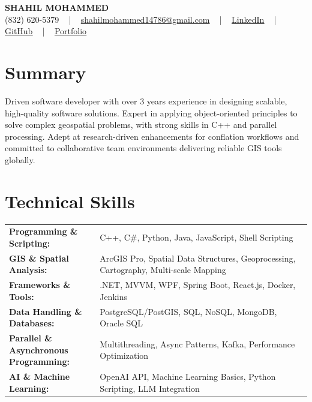 \documentclass[letterpaper,11pt]{article}
\begin{document}
\begin{center}
    {\fontsize{14pt}{12pt}\selectfont \textbf{\MakeUppercase{Shahil Mohammed}}}\\ \vspace{2pt}
    \fontsize{10pt}{12pt}\selectfont (832) 620-5379 ~ | ~ \href{mailto:shahilmohammed14786@gmail.com}{shahilmohammed14786@gmail.com} ~ | ~  
    \href{https://www.linkedin.com/in/shahil-mohammed-9652931a1/}{\color{blue}\underline{LinkedIn}}  ~ | ~ 
    \href{https://github.com/freakbeast14}{\color{blue}\underline{GitHub}} ~ | ~ 
    \href{https://shahil-mohammed.netlify.app/}{\color{blue}\underline{Portfolio}}
    \vspace{-8pt}
\end{center}

\section{Summary}
\fontsize{9pt}{10pt}\selectfont
Driven software developer with over 3 years experience in designing scalable, high-quality software solutions. Expert in applying object-oriented principles to solve complex geospatial problems, with strong skills in C++ and parallel processing. Adept at research-driven enhancements for conflation workflows and committed to collaborative team environments delivering reliable GIS tools globally.
 \vspace{-5pt}
 
\section{Technical Skills}
        \vspace{-14pt}
        \begin{table}[h]
            \fontsize{9pt}{10pt}\selectfont
            \begin{tabular}{p{0.3\linewidth} p{0.7\linewidth}}
                \textbf{Programming \& Scripting:} & C++, C\#, Python, Java, JavaScript, Shell Scripting \\
                \textbf{GIS \& Spatial Analysis:} & ArcGIS Pro, Spatial Data Structures, Geoprocessing, Cartography, Multi-scale Mapping \\
                \textbf{Frameworks \& Tools:} & .NET, MVVM, WPF, Spring Boot, React.js, Docker, Jenkins \\
                \textbf{Data Handling \& Databases:} & PostgreSQL/PostGIS, SQL, NoSQL, MongoDB, Oracle SQL \\
                \textbf{Parallel \& Asynchronous Programming:} & Multithreading, Async Patterns, Kafka, Performance Optimization \\
                \textbf{AI \& Machine Learning:} & OpenAI API, Machine Learning Basics, Python Scripting, LLM Integration \\
            \end{tabular}
        \end{table}
 \vspace{-15pt}
 
\end{document}
